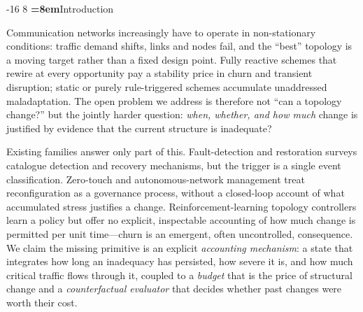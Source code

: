 \documentclass[runningheads]{llncs}
\makeatletter
\renewcommand\section{\@startsection{section}{1}{\z@}%
  {-16\p@ \@plus -4\p@ \@minus -4\p@}%
  {8\p@ \@plus 4\p@ \@minus 4\p@}%
  {\normalfont\large\bfseries\boldmath\color{vitblue}%
   \rightskip=\z@ \@plus 8em\pretolerance=10000}}
\let\plens@section\section
\renewcommand\section{\clearpage\plens@section}
\makeatother
\begin{document}
\section{Introduction}
\label{sec:intro}

Communication networks increasingly have to operate in non-stationary
conditions: traffic demand shifts, links and nodes fail, and the ``best''
topology is a moving target rather than a fixed design point. Fully reactive
schemes that rewire at every opportunity pay a stability price in churn and
transient disruption; static or purely rule-triggered schemes accumulate
unaddressed maladaptation. The open problem we address is therefore not
``can a topology change?'' but the jointly harder question: \emph{when,
whether, and how much} change is justified by evidence that the current
structure is inadequate?

Existing families answer only part of this. Fault-detection and
restoration surveys \cite{alhiyari2025,makiyah2026} catalogue detection and
recovery mechanisms, but the trigger is a single event classification.
Zero-touch and autonomous-network management \cite{riggio2022,ullah2025}
treat reconfiguration as a governance process, without a closed-loop account
of what accumulated stress justifies a change. Reinforcement-learning
topology controllers \cite{si2024,chu2025,song2026,guo2024} learn a policy
but offer no explicit, inspectable accounting of how much change is
permitted per unit time—churn is an emergent, often uncontrolled,
consequence. We claim the missing primitive is an explicit
\emph{accounting mechanism}: a state that integrates how long an
inadequacy has persisted, how severe it is, and how much critical traffic
flows through it, coupled to a \emph{budget} that is the price of structural
change and a \emph{counterfactual evaluator} that decides whether past
changes were worth their cost.
\end{document}
